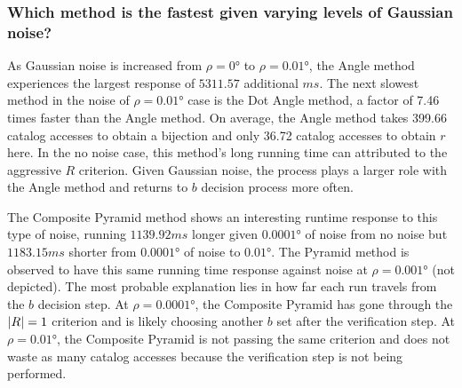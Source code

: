 \subsubsection{Which method is the fastest given varying levels of Gaussian noise?}
As Gaussian noise is increased from $\rho=\ang{0}$ to $\rho=\ang{0.01}$, the Angle method experiences the largest
response of $5311.57$ additional $\si{ms}$.
The next slowest method in the noise of $\rho=\ang{0.01}$ case is the Dot Angle method, a factor of 7.46 times faster
than the Angle method.
On average, the Angle method takes 399.66 catalog accesses to obtain a bijection and only 36.72 catalog accesses
to obtain $r$ here.
In the no noise case, this method's long running time can attributed to the aggressive $R$ criterion.
Given Gaussian noise, the  process plays a larger role with the Angle method and returns to $b$
decision process more often.

The Composite Pyramid method shows an interesting runtime response to this type of noise, running $1139.92\si{ms}$
longer given $\ang{0.0001}$ of noise from no noise but $1183.15\si{ms}$ shorter from $\ang{0.0001}$ of noise to
$\ang{0.01}$.
The Pyramid method is observed to have this same running time response against noise at $\rho=\ang{0.001}$
(not depicted).
The most probable explanation lies in how far each run travels from the $b$ decision step.
At $\rho=\ang{0.0001}$, the Composite Pyramid has gone through the $\left| R \right| = 1$ criterion and is likely choosing
another $b$ set after the verification step.
At $\rho=\ang{0.01}$, the Composite Pyramid is not passing the same criterion and does not waste as many catalog
accesses because the verification step is not being performed.

